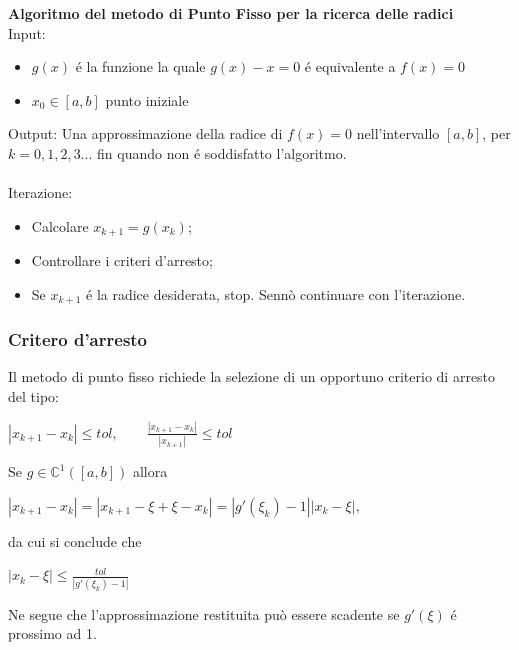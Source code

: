 \documentclass[12pt, letterpaper]{article}
\begin{document}
\textbf{Algoritmo del metodo di Punto Fisso per la ricerca delle radici}\\
Input:
\begin{itemize}
    \item $g(x)$ \'e la funzione la quale $g(x)-x=0$ \'e equivalente a $f(x)=0$ 
    \item $x_0 \in [a,b]$ punto iniziale
\end{itemize}
Output: Una approssimazione della radice di $f(x)=0$ nell'intervallo $[a,b]$, per $k=0,1,2,3...$ fin quando non \'e soddisfatto l'algoritmo. \\~\\
Iterazione:
\begin{itemize}
    \item Calcolare $x_{k+1}=g(x_k)$;
    \item Controllare i criteri d'arresto;
    \item Se $x_{k+1}$ \'e la radice desiderata, stop. Sennò continuare con l'iterazione. 
\end{itemize}
\subsubsection{Critero d'arresto}
Il metodo di punto fisso richiede la selezione di un opportuno criterio di arresto del tipo:
\begin{center}
    $|x_{k+1}-x_k| \leq tol, \qquad \frac{|x_{k+1}-x_k|}{|x_{k+1}|} \leq tol $
\end{center}
Se $g \in \mathbb{C}^1([a,b])$ allora
\begin{center}
    $|x_{k+1}-x_k|=|x_{k+1}-\xi+\xi-x_k| = |g'(\xi_k)-1||x_k-\xi|,$
\end{center}
da cui si conclude che
\begin{center}
    $|x_k-\xi| \leq \frac{tol}{|g'(\xi_k)-1|}$
\end{center}
Ne segue che l'approssimazione restituita può essere scadente se $g'(\xi)$ \'e prossimo ad 1.
\end{document}

